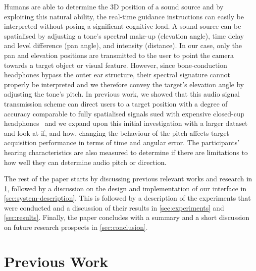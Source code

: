 \documentclass[]{interact}
\begin{document}
Humans are able to determine the 3D position of a sound source and by exploiting this natural ability, the real-time guidance instructions can easily be interpreted without posing a significant cognitive load.
A sound source can be spatialised by adjusting a tone's spectral make-up (elevation angle), time delay and level difference (pan angle), and intensity (distance).
In our case, only the pan and elevation positions are transmitted to the user to point the camera towards a target object or visual feature.
However, since bone-conduction headphones bypass the outer ear structure, their spectral signature cannot properly be interpreted and we therefore convey the target's elevation angle by adjusting the tone's pitch.
In previous work, we showed that this audio signal transmission scheme can direct users to a target position with a degree of accuracy comparable to fully spatialised signals sued with expensive closed-cup headphones~\citep{lock2019bone,macdonald2006spatial} and we expand upon this initial investigation with a larger dataset and look at if, and how, changing the behaviour of the pitch affects target acquisition performance in terms of time and angular error. 
The participants' hearing characteristics are also measured to determine if there are limitations to how well they can determine audio pitch or direction. 

The rest of the paper starts by discussing previous relevant works and research in \cref{sec:prev-work}, followed by a discussion on the design and implementation of our interface in \cref{sec:system-description}.
This is followed by a description of the experiments that were conducted and a discussion of their results in \cref{sec:experiments} and \cref{sec:results}.
Finally, the paper concludes with a summary and a short discussion on future research prospects in \cref{sec:conclusion}.

\section{Previous Work}\label{sec:prev-work}
\end{document}
